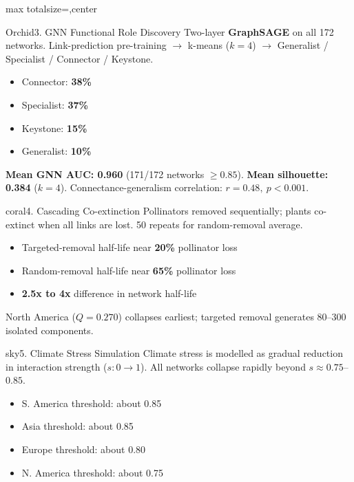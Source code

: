 \documentclass[10pt]{article}
\begin{document}
\begin{adjustbox}{max totalsize={\textwidth}{\textheight},center}
\begin{minipage}{\textwidth}
\begin{minipage}[t]{0.327\textwidth}
\vspace{1.0mm}
\begin{card}{Orchid}{3. GNN Functional Role Discovery}
Two-layer \textbf{GraphSAGE} on all 172 networks. Link-prediction pre-training $\rightarrow$ k-means ($k=4$) $\rightarrow$ Generalist / Specialist / Connector / Keystone.

\begin{itemize}[leftmargin=*,nosep]
  \item Connector: \textbf{38\%}
  \item Specialist: \textbf{37\%}
  \item Keystone: \textbf{15\%}
  \item Generalist: \textbf{10\%}
\end{itemize}

\textbf{Mean GNN AUC: 0.960} (171/172 networks $\ge 0.85$). \textbf{Mean silhouette: 0.384} ($k=4$). Connectance-generalism correlation: $r=0.48,\ p<0.001$.
\end{card}

\end{minipage}\hfill
\begin{minipage}[t]{0.327\textwidth}

\begin{card}{coral}{4. Cascading Co-extinction}
Pollinators removed sequentially; plants co-extinct when all links are lost. 50 repeats for random-removal average.

\begin{itemize}[leftmargin=*,nosep]
  \item Targeted-removal half-life near \textbf{20\%} pollinator loss
  \item Random-removal half-life near \textbf{65\%} pollinator loss
  \item \textbf{2.5x to 4x} difference in network half-life
\end{itemize}

North America ($Q=0.270$) collapses earliest; targeted removal generates 80--300 isolated components.
\end{card}

\vspace{1.0mm}
\begin{card}{sky}{5. Climate Stress Simulation}
Climate stress is modelled as gradual reduction in interaction strength ($s:0\rightarrow1$). All networks collapse rapidly beyond $s\approx0.75$--$0.85$.

\begin{itemize}[leftmargin=*,nosep]
  \item S. America threshold: about 0.85
  \item Asia threshold: about 0.85
  \item Europe threshold: about 0.80
  \item N. America threshold: about 0.75
\end{itemize}


\end{card}
\end{minipage}
\end{minipage}
\end{adjustbox}
\end{document}
